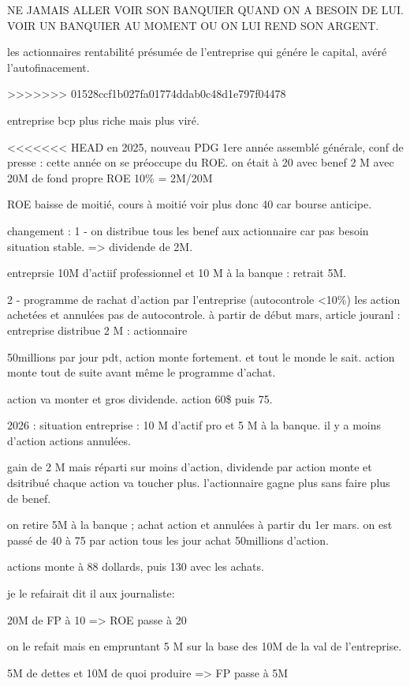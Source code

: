 \documentclass[a4paper,12pt]{article}
\begin{document}
NE JAMAIS ALLER VOIR SON BANQUIER QUAND ON A BESOIN DE LUI.
VOIR UN BANQUIER AU MOMENT OU ON LUI REND SON ARGENT.


les actionnaires rentabilité présumée de l'entreprise qui génére le capital, avéré  l'autofinacement. 

>>>>>>> 01528ccf1b027fa01774ddab0c48d1e797f04478

entreprise bcp plus riche mais plus viré.

<<<<<<< HEAD
en 2025, nouveau PDG 1ere année
assemblé générale, conf de presse : cette année on se préoccupe du ROE.
on était à 20  avec benef 2 M avec 20M de fond propre  ROE 10\% = 2M/20M

ROE baisse de moitié, cours à moitié voir plus donc 40 car bourse anticipe.

changement : 1 - on distribue tous les benef aux actionnaire car pas besoin situation stable.
=> dividende de 2M.

entreprsie 10M d'actiif professionnel et 10 M à la banque : retrait 5M.

2 - programme de rachat d'action par l'entreprise  (autocontrole <10\%)
les action achetées et annulées pas de autocontrole. 
à partir de début mars, 
article jouranl : entreprise distribue 2 M : actionnaire 

50millions par jour pdt, action monte fortement. et tout le monde le sait.
action monte tout de suite avant même le programme d'achat.

action va monter et gros dividende.
action 60\$ puis 75.

2026 : situation entreprise : 10 M d'actif pro et 5 M à la banque.
il y a moins d'action actions annulées.

gain de 2 M mais réparti sur moins d'action, dividende par action monte et dsitribué
chaque action va toucher plus. l'actionnaire gagne plus sans faire plus de benef.

on retire 5M à la banque ; achat action et annulées à partir du 1er mars.
on est passé de 40 à 75 par action tous les jour achat 50millions d'action.

actions monte à 88 dollards, puis 130 avec les achats.

je le refairait dit il aux journaliste:

20M de FP à 10 => ROE passe à 20

on le refait mais en empruntant 5 M sur la base des 10M de la val de l'entreprise.

5M de dettes et 10M de quoi produire => FP passe à 5M
\end{document}

